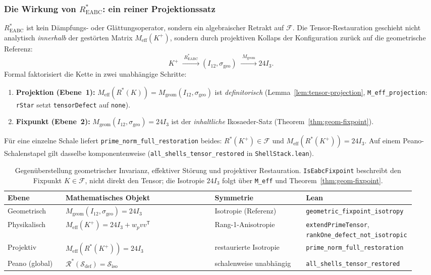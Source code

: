 \documentclass[11pt,a4paper]{article}
\begin{document}
	\subsubsection{Die Wirkung von $R^*_{\mathrm{EABC}}$: ein reiner Projektionssatz}
	
	$R^*_{\mathrm{EABC}}$ ist kein Dämpfungs- oder Glättungsoperator, sondern ein
	algebraischer Retrakt auf $\mathcal{F}$.
	Die Tensor-Restauration geschieht nicht analytisch \emph{innerhalb} der gestörten
	Matrix $M_{\mathrm{eff}}(K^+)$, sondern durch projektiven Kollaps der Konfiguration
	zurück auf die geometrische Referenz:
	\[
	K^+
	\;\xrightarrow{\;R^*_{\mathrm{EABC}}\;}
	(I_{12},\sigma_{\mathrm{geo}})
	\;\xrightarrow{\;M_{\mathrm{geom}}\;}
	24I_3.
	\]
	Formal faktorisiert die Kette in zwei unabhängige Schritte:
	\begin{enumerate}
		\item \textbf{Projektion (Ebene~1):}
		$M_{\mathrm{eff}}(R^*(K))=M_{\mathrm{geom}}(I_{12},\sigma_{\mathrm{geo}})$
		ist \emph{definitorisch}
		(Lemma~\ref{lem:tensor-projection}, \texttt{M\_eff\_projection}:
		\texttt{rStar} setzt \texttt{tensorDefect} auf \texttt{none}).
		\item \textbf{Fixpunkt (Ebene~2):}
		$M_{\mathrm{geom}}(I_{12},\sigma_{\mathrm{geo}})=24I_3$
		ist der \emph{inhaltliche} Ikosaeder-Satz
		(Theorem~\ref{thm:geom-fixpoint}).
	\end{enumerate}
	Für eine einzelne Schale liefert \texttt{prime\_norm\_full\_restoration} beides:
	$R^*(K^+)\in\mathcal{F}$ und $M_{\mathrm{eff}}(R^*(K^+))=24I_3$.
	Auf einem Peano-Schalenstapel gilt dasselbe komponentenweise
	(\texttt{all\_shells\_tensor\_restored} in \texttt{ShellStack.lean}).
	
	\begin{table}[h!]
		\centering
		\small
		\begin{tabular}{p{0.14\linewidth}p{0.36\linewidth}p{0.22\linewidth}p{0.22\linewidth}}
			\hline
			\textbf{Ebene} & \textbf{Mathematisches Objekt} & \textbf{Symmetrie} & \textbf{Lean} \\
			\hline
			Geometrisch &
			$M_{\mathrm{geom}}(I_{12},\sigma_{\mathrm{geo}})=24I_3$ &
			Isotropie (Referenz) &
			\texttt{geometric\_fixpoint\_isotropy} \\
			Physikalisch &
			$M_{\mathrm{eff}}(K^+)=24I_3+w_pvv^{\mathsf T}$ &
			Rang-1-Anisotropie &
			\texttt{extendPrimeTensor}, \texttt{rankOne\_defect\_not\_isotropic} \\
			Projektiv &
			$M_{\mathrm{eff}}(R^*(K^+))=24I_3$ &
			restaurierte Isotropie &
			\texttt{prime\_norm\_full\_restoration} \\
			Peano (global) &
			$\mathcal{R}^*(\mathcal{S}_{\mathrm{def}})=\mathcal{S}_{\mathrm{iso}}$ &
			schalenweise unabhängig &
			\texttt{all\_shells\_tensor\_restored} \\
			\hline
		\end{tabular}
		\caption{Gegenüberstellung geometrischer Invarianz, effektiver Störung und projektiver Restauration.
			\texttt{IsEabcFixpoint} beschreibt den Fixpunkt $K\in\mathcal{F}$, nicht direkt den Tensor;
			die Isotropie $24I_3$ folgt über \texttt{M\_eff} und Theorem~\ref{thm:geom-fixpoint}.}
		\label{tab:two-levels}
	\end{table}
	
\end{document}

